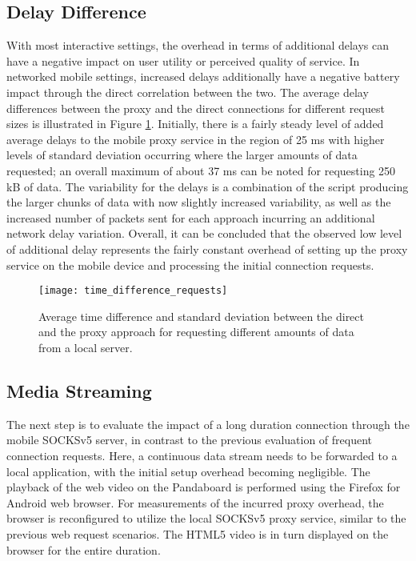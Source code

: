 \subsection*{Delay Difference}
With most interactive settings, the overhead in terms of
additional delays can have a negative impact on user utility
or perceived quality of service. In networked mobile settings,
increased delays additionally have a negative battery impact
through the direct correlation between the two.
The average delay differences between the proxy and the direct
connections for different request sizes is illustrated in Figure \ref{fig:time_difference_requests}. Initially,
there is a fairly steady level of added average delays to the
mobile proxy service in the region of 25 ms with higher levels of standard deviation occurring where the larger amounts
of data requested; an overall maximum of about 37 ms can
be noted for requesting 250 kB of data. The variability for
the delays is a combination of the script producing the larger
chunks of data with now slightly increased variability, as well
as the increased number of packets sent for each approach
incurring an additional network delay variation.
Overall, it can be concluded that the observed low level of additional
delay represents the fairly constant overhead of setting
up the proxy service on the mobile device and processing the
initial connection requests.

\begin{figure}
\centering
\texttt{[image: time\_difference\_requests]}
\caption{Average time difference and standard deviation between the direct and the proxy approach for requesting different amounts of data from a local server.}
\label{fig:time_difference_requests}
\end{figure}

\subsection*{Media Streaming}
The next step is to evaluate the impact of a long duration
connection through the mobile SOCKSv5 server, in contrast
to the previous evaluation of frequent connection requests.
Here, a continuous data stream needs to be forwarded to a
local application, with the initial setup overhead becoming
negligible. The playback of the web video on the Pandaboard
is performed using the Firefox for Android web browser. For
measurements of the incurred proxy overhead, the browser
is reconfigured to utilize the local SOCKSv5 proxy service,
similar to the previous web request scenarios. The HTML5
video is in turn displayed on the browser for the entire
duration.

